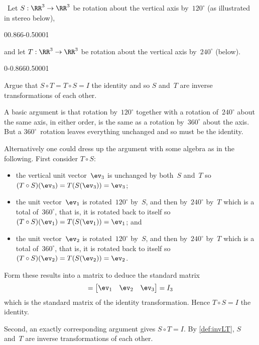 \begin{example} \label{eg:}\ 
Let \(S:\RR^3\to\RR^3\) be rotation about the vertical axis by~\(120^\circ\) (as illustrated in stereo below), 
\begin{center}
0{0.866}{-0.5}0001
\end{center}
and let \(T:\RR^3\to\RR^3\) be rotation about the vertical axis by~\(240^\circ\) (below).
\begin{center}
0{-0.866}{0.5}0001
\end{center}
Argue that \(S\circ T=T\circ S=I\) the identity and so \(S\) and~\(T\) are {inverse transformation}s of each other.
\begin{solution} 
A basic argument is that rotation by~\(120^\circ\) together with a rotation of~\(240^\circ\) about the same axis, in either order, is the same as a rotation by~\(360^\circ\) about the axis.
But a \(360^\circ\)~rotation leaves everything unchanged and so must be the identity.

Alternatively one could dress up the argument with some algebra as in the following.
First consider \(T\circ S\):
\begin{itemize}
\item the vertical unit vector~\(\ev_3\) is unchanged by both~\(S\) and~\(T\) so \((T\circ S)(\ev_3)=T(S(\ev_3))=\ev_3\);
\item the unit vector~\(\ev_1\) is rotated~\(120^\circ\) by~\(S\), and then by~\(240^\circ\) by~\(T\) which is a total of~\(360^\circ\), that is, it is rotated back to itself so \((T\circ S)(\ev_1)=T(S(\ev_1))=\ev_1\); and
\item the unit vector~\(\ev_2\) is rotated~\(120^\circ\) by~\(S\), and then by~\(240^\circ\) by~\(T\) which is a total of~\(360^\circ\), that is, it is rotated back to itself so \((T\circ S)(\ev_2)=T(S(\ev_2))=\ev_2\).
\end{itemize}
Form these results into a matrix to deduce the standard matrix
\begin{equation*}
[T\circ S]=\begin{bmatrix} \ev_1&\ev_2&\ev_3 \end{bmatrix}
=I_3
\end{equation*}
which is the standard matrix of the identity transformation.
Hence \(T\circ S=I\) the identity.

Second, an exactly corresponding argument gives  \(S\circ T=I\).
By \autoref{def:invLT}, \(S\) and~\(T\) are inverse transformations of each other.
\end{solution}
\end{example}



